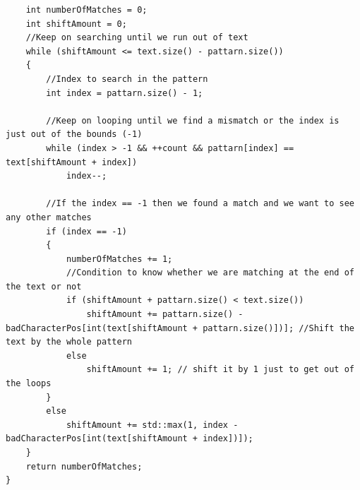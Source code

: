 \documentclass{article}
\theoremstyle{plain}
\begin{document}
\begin{verbatim}
    int numberOfMatches = 0;
    int shiftAmount = 0;
    //Keep on searching until we run out of text
    while (shiftAmount <= text.size() - pattarn.size())
    {
        //Index to search in the pattern
        int index = pattarn.size() - 1;

        //Keep on looping until we find a mismatch or the index is just out of the bounds (-1)
        while (index > -1 && ++count && pattarn[index] == text[shiftAmount + index])
            index--;

        //If the index == -1 then we found a match and we want to see any other matches
        if (index == -1)
        {
            numberOfMatches += 1;
            //Condition to know whether we are matching at the end of the text or not
            if (shiftAmount + pattarn.size() < text.size())
                shiftAmount += pattarn.size() - badCharacterPos[int(text[shiftAmount + pattarn.size()])]; //Shift the text by the whole pattern
            else
                shiftAmount += 1; // shift it by 1 just to get out of the loops
        }
        else
            shiftAmount += std::max(1, index - badCharacterPos[int(text[shiftAmount + index])]);
    }
    return numberOfMatches;
}
\end{verbatim}
\newpage
\end{document}
